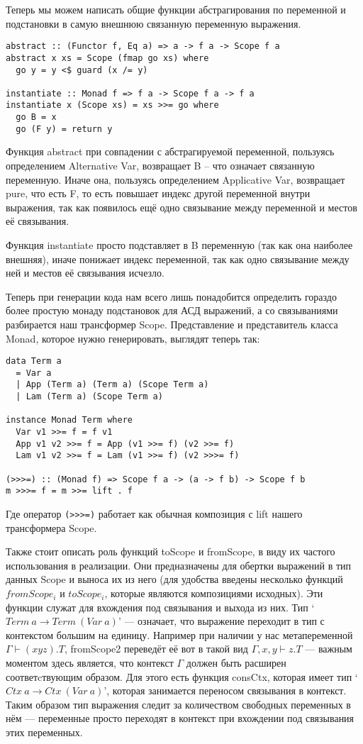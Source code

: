 Теперь мы можем написать общие функции абстрагирования по переменной и подстановки в самую внешнюю связанную переменную выражения.
\begin{lstlisting}[frame=single]
abstract :: (Functor f, Eq a) => a -> f a -> Scope f a
abstract x xs = Scope (fmap go xs) where
  go y = y <$ guard (x /= y)

instantiate :: Monad f => f a -> Scope f a -> f a
instantiate x (Scope xs) = xs >>= go where
  go B = x
  go (F y) = return y
\end{lstlisting}

Функция abstract при совпадении с абстрагируемой переменной, пользуясь определением Alternative Var, возвращает B -- что означает связанную переменную. Иначе она, пользуясь определением Applicative Var, возвращает pure, что есть F, то есть повышает индекс другой переменной внутри выражения, так как появилось ещё одно связывание между переменной и местов её связывания.

Функция instantiate просто подставляет в B переменную (так как она наиболее внешняя), иначе понижает индекс переменной, так как одно связывание между ней и местов её связывания исчезло.

Теперь при генерации кода нам всего лишь понадобится определить гораздо более простую монаду подстановок для АСД выражений, а со связываниями разбирается наш трансформер Scope. Представление и представитель класса Monad, которое нужно генерировать, выглядят теперь так:

\begin{lstlisting}[frame=single]
data Term a
  = Var a
  | App (Term a) (Term a) (Scope Term a)
  | Lam (Term a) (Scope Term a)

instance Monad Term where
  Var v1 >>= f = f v1
  App v1 v2 >>= f = App (v1 >>= f) (v2 >>= f)
  Lam v1 v2 >>= f = Lam (v1 >>= f) (v2 >>>= f)

(>>>=) :: (Monad f) => Scope f a -> (a -> f b) -> Scope f b
m >>>= f = m >>= lift . f
\end{lstlisting}

Где оператор \lstinline{(>>>=)} работает как обычная композиция с lift нашего трансформера Scope.

Также стоит описать роль функций toScope и fromScope, в виду их частого использования в реализации. Они предназначены для обертки выражений в тип данных Scope и выноса их из него (для удобства введены несколько функций $fromScope_i$ и $toScope_i$, которые являются композициями исходных). Эти функции служат для вхождения под связывания и выхода из них. Тип `$Term\ a \rightarrow Term\ (Var\ a)$' --- означает, что выражение переходит в тип с контекстом большим на единицу. Например при наличии у нас метапеременной $\Gamma \vdash (x y z).T$, fromScope2 переведёт её вот в такой вид $\Gamma, x, y \vdash z.T$ --- важным моментом здесь является, что контекст $\Gamma$ должен быть расширен соответcтвующим образом. Для этого есть функция consCtx, которая имеет тип `$Ctx\ a \rightarrow Ctx\ (Var\ a)$', которая занимается переносом связывания в контекст. Таким образом тип выражения следит за количеством свободных переменных в нём --- переменные просто переходят в контекст при вхождении под связывания этих переменных.

